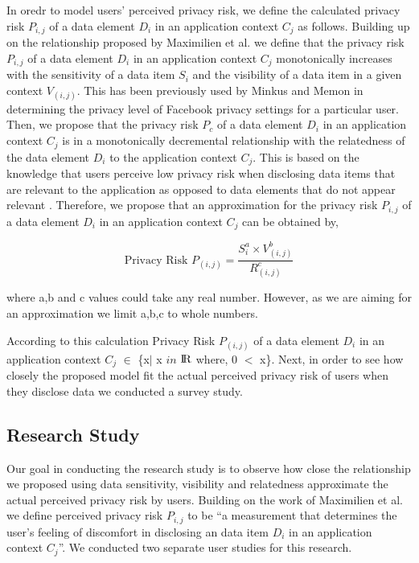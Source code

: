 \documentclass[10pt]{article}
\begin{document}
In oredr to model users' perceived privacy risk, we define the calculated privacy risk \textit{$P_{i,j}$} of a data element \textit {$D_i$} in an application context \textit {$C_j$} as follows. Building up on the relationship proposed by Maximilien et al. \cite {maximilien2009privacy} we define that the privacy risk \textit{$P_{i,j}$} of a data element \textit {$D_i$} in an application context \textit {$C_j$}  monotonically increases with the sensitivity of a data item \textit{$S_i$} and the visibility of a data item in a given context \textit{$V_{(i,j)}$}. This has been previously used by Minkus and Memon \cite{minkus2014scale} in determining the privacy level of Facebook privacy settings for a particular user. Then, we propose that the privacy risk \textit{$P_c$} of a data element \textit {$D_i$} in an application context \textit {$C_j$} is in a monotonically decremental relationship with the relatedness of the data element \textit {$D_i$} to the application context \textit {$C_j$}. This is based on the knowledge that users perceive low privacy risk when disclosing data items that are relevant to the application as opposed to data elements that do not appear relevant \cite {knijnenburg2013helping}. Therefore, we propose that an approximation for the privacy risk \textit{$P_{i,j}$} of a data element \textit {$D_i$} in an application context \textit {$C_j$} can be obtained by,

\[
\text {Privacy Risk $P_{(i,j)}$} =\frac{S_{i}^a \times V_{(i,j)}^b}{R_{(i,j)}^ c}
\]

where a,b and c values could take any real number. However, as we are aiming for an approximation we limit a,b,c to whole numbers.

According to this calculation Privacy Risk $P_{(i,j)}$  of a data element \textit {$D_i$} in an application context \textit {$C_j$} $\in$ \{x$\mid$ x $in$ ${\rm I\!R}$ where, 0 $<$ x\}. Next, in order to see how closely the proposed model fit the actual perceived privacy risk of users when they disclose data we conducted a survey study.

\subsection{Research Study}

Our goal in conducting the research study is to observe how close the relationship we proposed using data sensitivity, visibility and relatedness approximate the actual perceived privacy risk by users. Building on the work of Maximilien et al. \cite {maximilien2009privacy} we define perceived privacy risk $P_{i,j}$ to be \enquote{a measurement that determines the user's feeling of discomfort in disclosing an data item \textit {$D_i$} in an application context \textit {$C_j$}}. We conducted two separate user studies for this research. 
\end{document}

